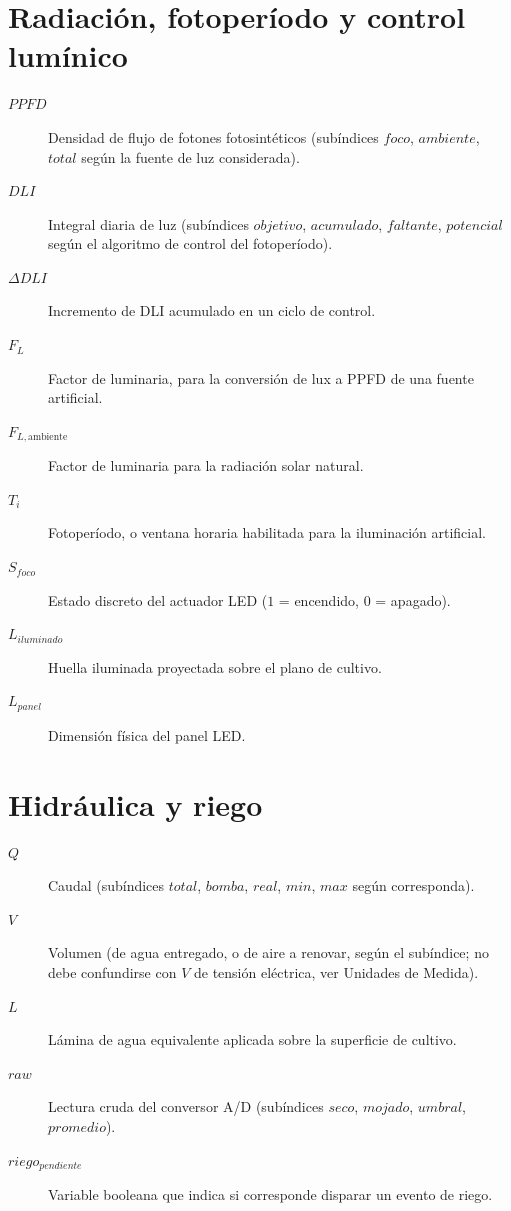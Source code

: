 \section*{Radiación, fotoperíodo y control lumínico}
\begin{description}
    \item[$PPFD$] Densidad de flujo de fotones fotosintéticos (subíndices $foco$, $ambiente$, $total$ según la fuente de luz considerada).
    \item[$DLI$] Integral diaria de luz (subíndices $objetivo$, $acumulado$, $faltante$, $potencial$ según el algoritmo de control del fotoperíodo).
    \item[$\Delta DLI$] Incremento de DLI acumulado en un ciclo de control.
    \item[$F_L$] Factor de luminaria, para la conversión de lux a PPFD de una fuente artificial.
    \item[$F_{L,\text{ambiente}}$] Factor de luminaria para la radiación solar natural.
    \item[$T_i$] Fotoperíodo, o ventana horaria habilitada para la iluminación artificial.
    \item[$S_{foco}$] Estado discreto del actuador LED ($1$ = encendido, $0$ = apagado).
    \item[$L_{iluminado}$] Huella iluminada proyectada sobre el plano de cultivo.
    \item[$L_{panel}$] Dimensión física del panel LED.
\end{description}

\section*{Hidráulica y riego}
\begin{description}
    \item[$Q$] Caudal (subíndices $total$, $bomba$, $real$, $min$, $max$ según corresponda).
    \item[$V$] Volumen (de agua entregado, o de aire a renovar, según el subíndice; no debe confundirse con $V$ de tensión eléctrica, ver Unidades de Medida).
    \item[$L$] Lámina de agua equivalente aplicada sobre la superficie de cultivo.
    \item[$raw$] Lectura cruda del conversor A/D (subíndices $seco$, $mojado$, $umbral$, $promedio$).
    \item[$riego_{pendiente}$] Variable booleana que indica si corresponde disparar un evento de riego.
\end{description}

